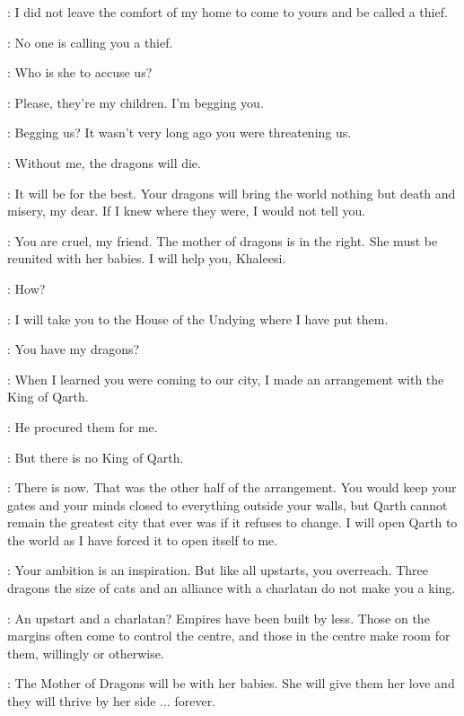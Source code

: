\SPICEKING: I did not leave the comfort of my home to come to yours and be called a thief.

\XARO: No one is calling you a thief.

\SPICEKING: Who is she to accuse us?

\DAENERYS: Please, they're my children. I'm begging you.

\SILKKING: Begging us? It wasn't very long ago you were threatening us.

\DAENERYS: Without me, the dragons will die.

\SPICEKING: It will be for the best. Your dragons will bring the world nothing but death and misery, my dear. If I knew where they were, I would not tell you.

\PYAT: You are cruel, my friend. The mother of dragons is in the right. She must be reunited with her babies. I will help you, Khaleesi.

\DAENERYS: How?

\PYAT: I will take you to the House of the Undying where I have put them.

\DAENERYS: You have my dragons?

\PYAT: When I learned you were coming to our city, I made an arrangement with the King of Qarth.


\PYAT: He procured them for me.

\DAENERYS: But there is no King of Qarth.


\XARO: There is now. That was the other half of the arrangement. You would keep your gates and your minds closed to everything outside your walls, but Qarth cannot remain the greatest city that ever was if it refuses to change. I will open Qarth to the world as I have forced it to open itself to me.

\SPICEKING: Your ambition is an inspiration. But like all upstarts, you overreach. Three dragons the size of cats and an alliance with a charlatan do not make you a king.

\XARO: An upstart and a charlatan? Empires have been built by less. Those on the margins often come to control the centre, and those in the centre make room for them, willingly or otherwise.

\PYAT: The Mother of Dragons will be with her babies. She will give them her love and they will thrive by her side $\ldots$ forever.

